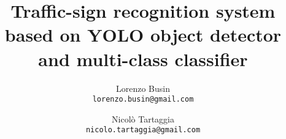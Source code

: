 \documentclass[10pt,twocolumn,letterpaper]{article}
\begin{document}
\title{Traffic-sign recognition system based on YOLO object detector and multi-class classifier}

\author{Lorenzo Busin\\
{\tt\small lorenzo.busin@gmail.com}
\and
Nicolò Tartaggia\\
{\tt\small nicolo.tartaggia@gmail.com}
}

\maketitle

\let\clearpage\relax


\end{document}
